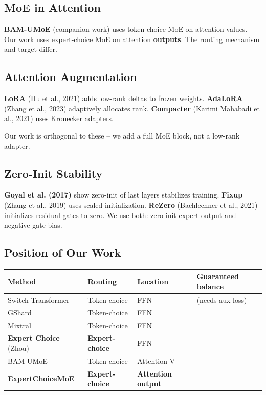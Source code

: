 \subsection{MoE in Attention}

\textbf{BAM-UMoE} (companion work) uses token-choice MoE on attention values. 
Our work uses expert-choice MoE on attention \textbf{outputs}. The routing 
mechanism and target differ.

\subsection{Attention Augmentation}

\textbf{LoRA} (Hu et al., 2021) adds low-rank deltas to frozen weights. 
\textbf{AdaLoRA} (Zhang et al., 2023) adaptively allocates rank. \textbf{Compacter} 
(Karimi Mahabadi et al., 2021) uses Kronecker adapters.

Our work is orthogonal to these -- we add a full MoE block, not a low-rank 
adapter.

\subsection{Zero-Init Stability}

\textbf{Goyal et al. (2017)} show zero-init of last layers stabilizes training. 
\textbf{Fixup} (Zhang et al., 2019) uses scaled initialization. \textbf{ReZero} 
(Bachlechner et al., 2021) initializes residual gates to zero. We use both: 
zero-init expert output and negative gate bias.

\subsection{Position of Our Work}

\begin{table}[H]
\centering
\small
\begin{tabular}{llll}
\toprule
\textbf{Method} & \textbf{Routing} & \textbf{Location} & \textbf{Guaranteed balance} \\
\midrule
Switch Transformer & Token-choice & FFN & (needs aux loss) \\
GShard & Token-choice & FFN &  \\
Mixtral & Token-choice & FFN &  \\
\textbf{Expert Choice} (Zhou) & \textbf{Expert-choice} & FFN &  \\
BAM-UMoE & Token-choice & Attention V &  \\
\textbf{ExpertChoiceMoE} & \textbf{Expert-choice} & \textbf{Attention output} &  \\
\bottomrule
\end{tabular}
\end{table}

